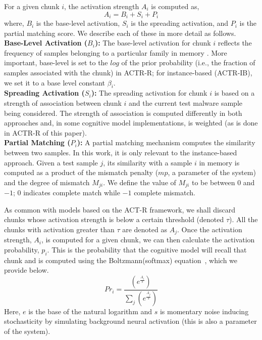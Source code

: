 \documentclass[conference]{IEEEtran}
\def\Pr{p}
\begin{document}
For a given chunk $i$, the activation strength $A_i$ is computed as,
\begin{equation}
\label{actStr}
A_i = B_i + S_i + P_i
\end{equation}
where, $B_i$ is the base-level activation, $S_i$ is the spreading activation, and $P_i$ is the partial matching score.  We describe each of these in more detail as follows.\\
{\bf Base-Level Activation ($B_i$):}
The base-level activation for chunk $i$ reflects the frequency of samples belonging to a particular family in memory . More important, base-level is set to the $log$ of the prior probability (i.e., the fraction of samples associated with the chunk) in ACTR-R; for instance-based (ACTR-IB), we set it to a base level constant $\beta_i$.\\ 
{\bf Spreading Activation ($S_i$):}
The spreading activation for chunk $i$ is based on a strength of association between chunk $i$ and the current test malware sample being considered.  The strength of association is computed differently in both approaches and, in some cognitive model implementations, is weighted (as is done in ACTR-R of this paper).\\
{\bf Partial Matching ($P_i$):}
A partial matching mechanism computes the similarity between two samples.  In this work, it is only relevant to the instance-based approach. Given a test sample $j$, its similarity with a sample $i$ in memory is computed as a product of the mismatch penalty ($mp$, a parameter of the system) and the degree of mismatch $M_{ji}$.  We define the value of $M_{ji}$ to be between $0$ and $-1$; $0$ indicates complete match while $-1$ complete mismatch.

As common with models based on the ACT-R framework, we shall discard chunks whose activation strength is below a certain threshold (denoted $\tau$). All the chunks with activation greater than $\tau$ are denoted as $A_j$. Once the activation strength, $A_i$, is computed for a given chunk, we can then calculate the activation probability, $\Pr_i$.  This is the probability that the cognitive model will recall that chunk and is computed using the Boltzmann(softmax) equation~\cite{Sutton:1998}, which we provide below.
\begin{equation}
\label{retprob}
Pr_i = \dfrac{(e^{\frac{A_i}{s}})}{\sum_j (e^{\frac{A_j}{s}}) }
\end{equation}
Here, $e$ is the base of the natural logarithm and $s$ is momentary noise inducing stochasticity by simulating background neural activation (this is also a parameter of the system).  
\vspace{0em}
\end{document}
